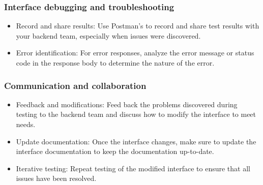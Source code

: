 \documentclass[journal]{IEEEtran}
\begin{document}
\subsubsection{Interface debugging and troubleshooting}
\begin{itemize}
  \item Record and share results: Use Postman's to record and share test results with your backend team, especially when issues were discovered.
  \item Error identification: For error responses, analyze the error message or status code in the response body to determine the nature of the error.
\end{itemize}
\subsubsection{Communication and collaboration}
\begin{itemize}
  \item Feedback and modifications: Feed back the problems discovered during testing to the backend team and discuss how to modify the interface to meet needs.
  \item Update documentation: Once the interface changes, make sure to update the interface documentation to keep the documentation up-to-date.
  \item Iterative testing: Repeat testing of the modified interface to ensure that all issues have been resolved.
\end{itemize}
\end{document}
